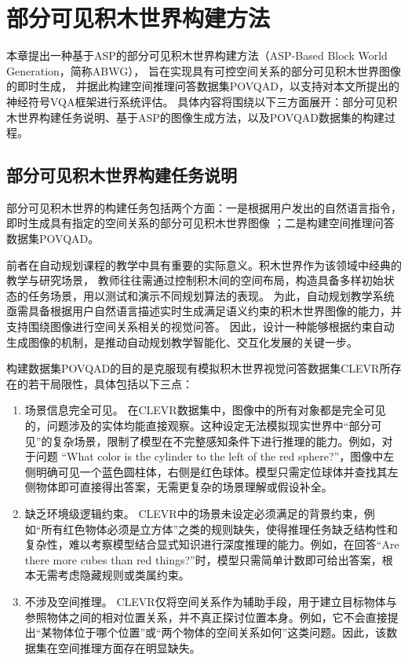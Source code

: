 \chapter{部分可见积木世界构建方法}
\label{dataset}
本章提出一种基于ASP的部分可见积木世界构建方法（ASP-Based Block World Generation，简称ABWG），
旨在实现具有可控空间关系的部分可见积木世界图像的即时生成，
并据此构建空间推理问答数据集POVQAD，以支持对本文所提出的神经符号VQA框架进行系统评估。
具体内容将围绕以下三方面展开：部分可见积木世界构建任务说明、基于ASP的图像生成方法，以及POVQAD数据集的构建过程。
\section{部分可见积木世界构建任务说明}
部分可见积木世界的构建任务包括两个方面：一是根据用户发出的自然语言指令，即时生成具有指定的空间关系的部分可见积木世界图像
；二是构建空间推理问答数据集POVQAD。

前者在自动规划课程的教学中具有重要的实际意义。积木世界作为该领域中经典的教学与研究场景，
教师往往需通过控制积木间的空间布局，构造具备多样初始状态的任务场景，用以测试和演示不同规划算法的表现。
为此，自动规划教学系统亟需具备根据用户自然语言描述实时生成满足语义约束的积木世界图像的能力，并支持围绕图像进行空间关系相关的视觉问答。
因此，设计一种能够根据约束自动生成图像的机制，是推动自动规划教学智能化、交互化发展的关键一步。

构建数据集POVQAD的目的是克服现有模拟积木世界视觉问答数据集CLEVR所存在的若干局限性，具体包括以下三点：
\begin{enumerate}[nosep]
\item 场景信息完全可见。 在CLEVR数据集中，图像中的所有对象都是完全可见的，问题涉及的实体均能直接观察。这种设定无法模拟现实世界中“部分可见”的复杂场景，限制了模型在不完整感知条件下进行推理的能力。例如，对于问题 “What color is the cylinder to the left of the red sphere?”，图像中左侧明确可见一个蓝色圆柱体，右侧是红色球体。模型只需定位球体并查找其左侧物体即可直接得出答案，无需更复杂的场景理解或假设补全。
\item 缺乏环境级逻辑约束。 CLEVR中的场景未设定必须满足的背景约束，例如“所有红色物体必须是立方体”之类的规则缺失，使得推理任务缺乏结构性和复杂性，难以考察模型结合显式知识进行深度推理的能力。例如，在回答“Are there more cubes than red things?”时，模型只需简单计数即可给出答案，根本无需考虑隐藏规则或类属约束。
\item 不涉及空间推理。 CLEVR仅将空间关系作为辅助手段，用于建立目标物体与参照物体之间的相对位置关系，并不真正探讨位置本身。例如，它不会直接提出“某物体位于哪个位置”或“两个物体的空间关系如何”这类问题。因此，该数据集在空间推理方面存在明显缺失。
\end{enumerate}

